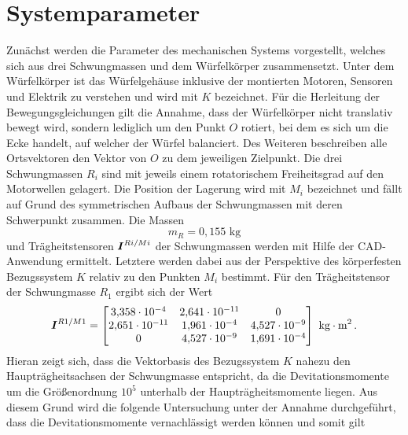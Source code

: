 \section{Systemparameter}\label{TM_3D_Systemparameter}
Zunächst werden die Parameter des mechanischen Systems vorgestellt, welches sich aus drei Schwungmassen und dem Würfelkörper zusammensetzt. Unter dem Würfelkörper ist das Würfelgehäuse inklusive der montierten Motoren, Sensoren und Elektrik zu verstehen und wird mit $K$ bezeichnet. Für die Herleitung der Bewegungsgleichungen gilt die Annahme, dass der Würfelkörper nicht translativ bewegt wird, sondern lediglich um den Punkt $O$ rotiert, bei dem es sich um die Ecke handelt, auf welcher der Würfel balanciert. Des Weiteren beschreiben alle Ortsvektoren den Vektor von $O$ zu dem jeweiligen Zielpunkt. Die drei Schwungmassen $R_i$ sind mit jeweils einem rotatorischem Freiheitsgrad auf den Motorwellen gelagert. Die Position der Lagerung wird mit $M_i$ bezeichnet und fällt auf Grund des symmetrischen Aufbaus der Schwungmassen mit deren Schwerpunkt zusammen.
Die Massen
\begin{equation}
m_R = 0{,}155\text{ kg}
\end{equation}
und Trägheitstensoren $\boldsymbol{I}^{Ri/Mi}$ der Schwungmassen werden mit Hilfe der CAD-Anwendung ermittelt. 
Letztere werden dabei aus der Perspektive des körperfesten Bezugssystem $K$ relativ zu den Punkten $M_i$ bestimmt. Für den Trägheitstensor der Schwungmasse $R_1$ ergibt sich der Wert
\begin{equation}
 \boldsymbol{I}^{R1/M1} = \begin{bmatrix}
3{,}358\cdot 10^{-4} & 2{,}641\cdot 10^{-11} & 0 
\\
2{,}651\cdot 10^{-11} & 1{,}961\cdot 10^{-4} & 4{,}527\cdot 10^{-9} 
\\
0 & 4{,}527\cdot 10^{-9} & 1{,}691\cdot 10^{-4}
\end{bmatrix} \text{ kg}\cdot \text{m}^2 \,.
\end{equation}
Hieran zeigt sich, dass die Vektorbasis des Bezugssystem $K$ nahezu den Haupträgheitsachsen der Schwungmasse entspricht, da die Devitationsmomente um die Größenordnung $10^{5}$ unterhalb der Haupträgheitsmomente liegen. Aus diesem Grund wird die folgende Untersuchung unter der Annahme durchgeführt, dass die Devitationsmomente vernachlässigt werden können und somit gilt
